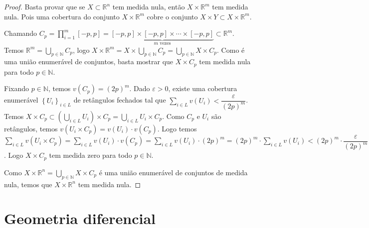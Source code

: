 \documentclass{article}
\theoremstyle{theorem}
\theoremstyle{lemma}
\theoremstyle{definition}
\theoremstyle{remark}
\begin{document}
\begin{proof}
	Basta provar que se $X\subset \mathbb{R}^n$ tem medida nula, então $X\times \mathbb{R}^m$ tem medida nula. Pois uma cobertura do conjunto $X\times \mathbb{R}^m$ cobre o conjunto $X\times Y \subset X \times \mathbb{R}^m$.


	Chamando $C_p =  \displaystyle\prod_{i  =  1}^{m} [-p, p] =\underbrace{ [-p,p] \times [-p,p]\times \cdots \times [-p,p]}_{m \text{ vezes}} \subset \mathbb{R}^m$. Temos $\mathbb{R}^m = \displaystyle\bigcup_{p \in \mathbb{N}} C_p$, logo $X\times \mathbb{R}^m = X\times\displaystyle\bigcup_{p\in \mathbb{N}} C_p = \displaystyle\bigcup_{p\in \mathbb{N}} X\times C_p$. Como é uma união enumerável de conjuntos, basta mostrar que $X\times C_p$ tem medida nula para todo $p\in \mathbb{N}$. 

	Fixando $ p \in \mathbb{N}$, temos $v\left(C_p\right) = (2p)^m$. Dado $\varepsilon > 0$, existe uma cobertura enumerável $\left\{ U_i\right\}_{i\in L}$ de retângulos fechados tal  que $\displaystyle\sum_{i \in L} v\left(U_i\right) < \dfrac{\varepsilon}{(2p)^m}$. Temos $X \times C_p \subset \left( \displaystyle\bigcup_{i \in L} U_i\right) \times C_p = \displaystyle\bigcup_{i \in L} U_i\times C_p$. Como $C_p$ e $U_i$ são retângulos, temos $v\left(U_i\times C_p \right) = v\left( U_i\right) \cdot v\left( C_p\right)$. Logo temos $\displaystyle\sum_{i \in L} v\left(U_i\times C_p\right) = \displaystyle\sum_{i \in L} v\left(U_i\right)\cdot v\left( C_p\right) = \displaystyle\sum_{i \in L} v\left(U_i\right) \cdot (2p)^{m} =  (2p)^{m}\cdot \displaystyle\sum_{i \in L} v\left(U_i\right) < (2p)^{m}\cdot \dfrac{\varepsilon}{(2p)^{m}} = \varepsilon$. Logo $X\times C_p$ tem medida zero para todo $p\in \mathbb{N}$.


	Como $X\times \mathbb{R}^n = \displaystyle\bigcup_{p\in \mathbb{N}} X\times C_p$ é uma união enumerável de conjuntos de medida nula, temos  que $X\times \mathbb{R}^n$ tem medida nula.

	
\end{proof}
\section{Geometria diferencial}
\end{document}
